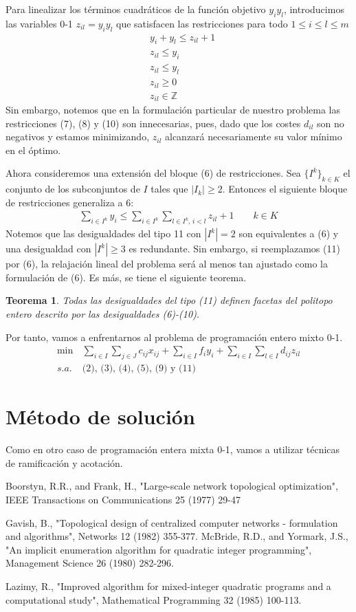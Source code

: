 \documentclass[twoside,12pt]{article}
\newtheorem{theorem}{Teorema}
\begin{document}
\newpage
Para linealizar los términos cuadráticos de la función objetivo $y_iy_l$, introducimos las variables 0-1 $z_{il} = y_iy_l$ que satisfacen las restricciones para todo $1\leq i \leq l \leq m$
\begin{align}
&y_i+y_l\leq z_{il}+1\\
&z_{il} \leq y_i\\
&z_{il}\leq y_l\\
&z_{il}\geq 0\\
&z_{il}\in \mathbb{Z}
\end{align}
Sin embargo, notemos que en la formulación particular de nuestro problema las restricciones (7), (8) y (10) son innecesarias, pues, dado que los costes $d_{il}$ son no negativos y estamos minimizando, $z_{il}$ alcanzará necesariamente su valor mínimo en el óptimo. 

Ahora consideremos una extensión del bloque (6) de restricciones. Sea $\{I^k\}_{k\in K}$ el conjunto de los subconjuntos de $I$ tales que $|I_k|\geq 2$. Entonces el siguiente bloque de restricciones generaliza a 6:
\begin{align}
\sum_{i\in I^k} y_i \leq  \sum_{i\in I^k} \sum_{l\in I^k,\,i<l} z_{il} +1 \qquad k\in K
\end{align}
Notemos que las desigualdades del tipo 11 con $|I^k| =2$ son equivalentes a (6) y una desigualdad con $|I^k|\geq 3$ es redundante. Sin embargo, si reemplazamos (11) por (6), la relajación lineal del problema será al menos tan ajustado como la formulación de (6). Es más, se tiene el siguiente teorema.
\begin{theorem}Todas las desigualdades del tipo (11) definen facetas del politopo entero descrito por las desigualdades (6)-(10). 
\end{theorem}
Por tanto, vamos a enfrentarnos al problema de programación entero mixto 0-1.
\begin{align*}
\min \,& \sum_{i\in I} \sum_{j\in J} c_{ij}x_{ij} + \sum_{i\in I} f_i y_i + \sum_{i \in I}\sum_{l \in I} d_{ij}z_{il}\\
s.a.\,& \text{(2), (3), (4), (5), (9) y (11)}
\end{align*}
\section{Método de solución}
Como en otro caso de programación entera mixta 0-1, vamos a utilizar técnicas de ramificación y acotación. 
\newpage
\begin{thebibliography}{9}
Boorstyn, R.R., and Frank, H., "Large-scale network
topological optimization", IEEE Transactions on Communications
25 (1977) 29-47

Gavish, B., "Topological design of centralized computer
networks - formulation and algorithms", Networks 12
(1982) 355-377. 
McBride, R.D., and Yormark, J.S., "An implicit enumeration algorithm for quadratic integer programming", Management Science 26 (1980) 282-296.

Lazimy, R., "Improved algorithm for mixed-integer quadratic programs and a computational study", Mathematical Programming 32 (1985) 100-113.
\end{thebibliography} 
\end{document}
